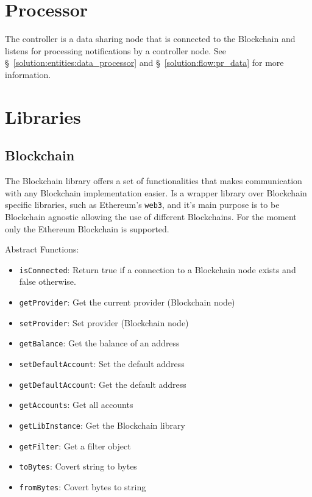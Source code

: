 \section{Processor}
\label{implemenation:processor}

The controller is a data sharing node that is connected to the Blockchain and listens for processing notifications by a controller node.  See §~\ref{solution:entities:data_processor} and §~\ref{solution:flow:pr_data} for more information.

\section{Libraries}
\label{implemenation:libs}

\subsection{Blockchain}
\label{implemenation:libs:bl}

The Blockchain library offers a set of functionalities that makes communication with any Blockchain implementation easier. Is a wrapper library over Blockchain specific libraries, such as Ethereum's \verb|web3|, and it's main purpose is to be Blockchain agnostic allowing the use of different Blockchains. For the moment only the Ethereum Blockchain is supported.

Abstract Functions:

\begin{itemize}
  \item \verb|isConnected|: Return true if a connection to a Blockchain node exists and false otherwise.
  \item \verb|getProvider|: Get the current provider (Blockchain node)
  \item \verb|setProvider|: Set provider (Blockchain node)
  \item \verb|getBalance|: Get the balance of an address
  \item \verb|setDefaultAccount|: Set the default address
  \item \verb|getDefaultAccount|: Get the default address
  \item \verb|getAccounts|: Get all accounts
  \item \verb|getLibInstance|: Get the Blockchain library
  \item \verb|getFilter|: Get a filter object
  \item \verb|toBytes|: Covert string to bytes
  \item \verb|fromBytes|: Covert bytes to string
\end{itemize}

